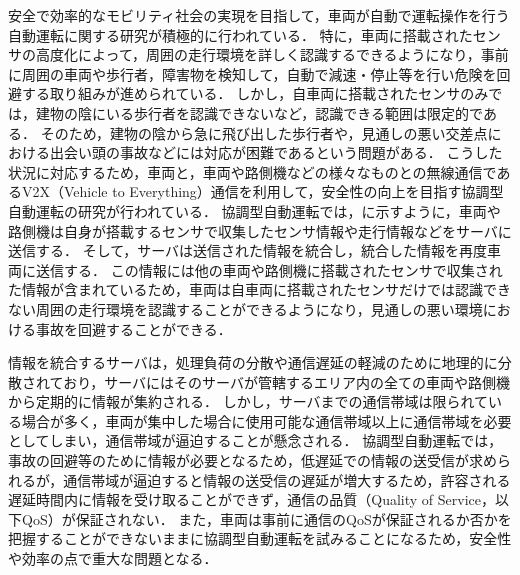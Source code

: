 \documentclass[a4paper,11pt,uplatex]{ujreport}
\begin{document}
    安全で効率的なモビリティ社会の実現を目指して，車両が自動で運転操作を行う自動運転に関する研究が積極的に行われている\cite{AD}．
    特に，車両に搭載されたセンサの高度化によって，周囲の走行環境を詳しく認識するできるようになり，事前に周囲の車両や歩行者，障害物を検知して，自動で減速・停止等を行い危険を回避する取り組みが進められている．
    しかし，自車両に搭載されたセンサのみでは，建物の陰にいる歩行者を認識できないなど，認識できる範囲は限定的である．
    そのため，建物の陰から急に飛び出した歩行者や，見通しの悪い交差点における出会い頭の事故などには対応が困難であるという問題がある．
    こうした状況に対応するため，車両と，車両や路側機などの様々なものとの無線通信であるV2X（Vehicle to Everything）通信を利用して，安全性の向上を目指す協調型自動運転の研究が行われている\cite{CAD, ITS}．
    協調型自動運転では，に示すように，車両や路側機は自身が搭載するセンサで収集したセンサ情報や走行情報などをサーバに送信する．
    そして，サーバは送信された情報を統合し，統合した情報を再度車両に送信する．
    この情報には他の車両や路側機に搭載されたセンサで収集された情報が含まれているため，車両は自車両に搭載されたセンサだけでは認識できない周囲の走行環境を認識することができるようになり，見通しの悪い環境における事故を回避することができる．\par
    情報を統合するサーバは，処理負荷の分散や通信遅延の軽減のために地理的に分散されており\cite{edge}，サーバにはそのサーバが管轄するエリア内の全ての車両や路側機から定期的に情報が集約される．
    しかし，サーバまでの通信帯域は限られている場合が多く，車両が集中した場合に使用可能な通信帯域以上に通信帯域を必要としてしまい，通信帯域が逼迫することが懸念される\cite{C-V2X}．
    協調型自動運転では，事故の回避等のために情報が必要となるため，低遅延での情報の送受信が求められるが，通信帯域が逼迫すると情報の送受信の遅延が増大するため，許容される遅延時間内に情報を受け取ることができず，通信の品質（Quality of Service，以下QoS）が保証されない．
    また，車両は事前に通信のQoSが保証されるか否かを把握することができないままに協調型自動運転を試みることになるため，安全性や効率の点で重大な問題となる．
\end{document}
